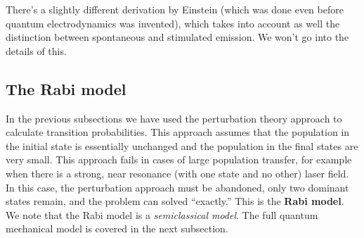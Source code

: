 \documentclass{book}
\theoremstyle{definition}
\begin{document}
There's a slightly different derivation by Einstein (which was done even before quantum electrodynamics was invented), which takes into account as well the distinction between spontaneous and stimulated emission. We won't go into the details of this. 



\subsection{The Rabi model}

In the previous subsections we have used the perturbation theory approach to calculate transition probabilities. This approach assumes that the population in the initial state is essentially unchanged and the population in the final states are very small. This approach fails in cases of large population transfer, for example when there is a strong, near resonance (with one state and no other) laser field. In this case, the perturbation approach must be abandoned, only two dominant states remain, and the problem can solved ``exactly.'' This is the \textbf{Rabi model}. We note that the Rabi model is a \textit{semiclassical model}. The full quantum mechanical model is covered in the next subsection. \\
\end{document}
